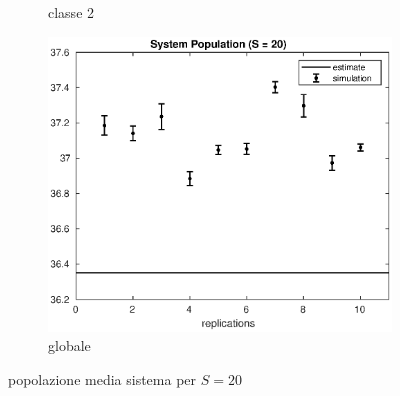\begin{figure}[!h]
\begin{subfigure}[t]{0.49\textwidth}
\caption{classe 2}
\label{20_n2}
\end{subfigure}
%
\begin{subfigure}[t]{0.5\textwidth}
\includegraphics[width=\textwidth]{figures/simul/20_500K_n}
\caption{globale}
\label{20_n}
\end{subfigure}
%
\caption{popolazione media sistema per $S = 20$}
\end{figure}
%

